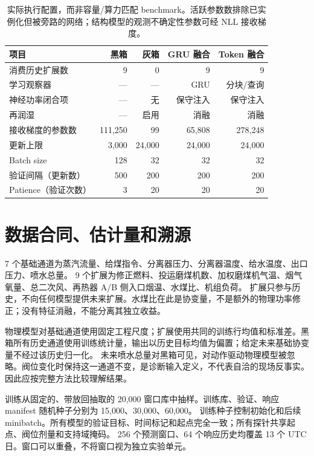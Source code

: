 \begin{table}[!ht]
\centering\small
\begin{tabular}{lrrrr}
\toprule
项目 & 黑箱 & 灰箱 & GRU 融合 & Token 融合\\
\midrule
消费历史扩展数 & 9 & 0 & 9 & 9\\
学习观察器 & --- & --- & GRU & 分块/查询\\
神经功率闭合项 & --- & 无 & 保守注入 & 保守注入\\
再润湿 & --- & 启用 & 消融 & 消融\\
接收梯度的参数数 & 111,250 & 99 & 65,808 & 278,248\\
更新上限 & 3,000 & 24,000 & 24,000 & 24,000\\
Batch size & 128 & 32 & 32 & 32\\
验证间隔（更新数） & 500 & 200 & 200 & 200\\
Patience（验证次数） & 3 & 20 & 20 & 20\\
\bottomrule
\end{tabular}
\caption{实际执行配置，而非容量/算力匹配 benchmark。活跃参数数排除已实例化但被旁路的网络；结构模型的观测不确定性参数可经 NLL 接收梯度。}
\end{table}

\section{数据合同、估计量和溯源}\label{app:stats}

7 个基础通道为蒸汽流量、给煤指令、分离器压力、分离器温度、给水温度、出口压力、喷水总量。
9 个扩展为修正燃料、投运磨煤机数、加权磨煤机气温、烟气氧量、总二次风、再热器 A/B 侧入口烟温、水煤比、机组负荷。
扩展只参与历史，不向任何模型提供未来扩展。水煤比在此是协变量，不是额外的物理功率修正；没有特征消融，不能分离其独立收益。

物理模型对基础通道使用固定工程尺度；扩展使用共同的训练行均值和标准差。黑箱所有历史通道使用训练统计量，输出以历史目标均值为偏置；给定未来基础协变量不经过该历史归一化。
未来喷水总量对黑箱可见，对动作驱动物理模型被忽略。阀位变化时保持这一通道不变，是诊断输入定义，不代表自洽的现场反事实。因此应按完整方法比较理解结果。

训练从固定的、带放回抽取的 20,000 窗口库中抽样。训练库、验证、响应 manifest 随机种子分别为 15,000、30,000、60,000。
训练种子控制初始化和后续 minibatch。所有模型的验证目标、时间标记和起点完全一致；所有探针共享起点、阀位剂量和支持域掩码。
256 个预测窗口、64 个响应历史均覆盖 13 个 UTC 日。窗口可以重叠，不将窗口视为独立实验单元。

